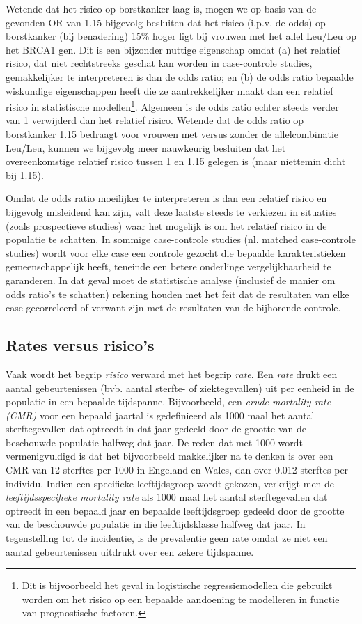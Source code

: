 \documentclass[
  dutch,
  letterpaper,
  12pt]{book}
\theoremstyle{definition}
\theoremstyle{definition}
\theoremstyle{definition}
\theoremstyle{remark}
\begin{document}
Wetende dat het risico op borstkanker laag is, mogen we op basis van de
gevonden OR van 1.15 bijgevolg besluiten dat het risico (i.p.v. de odds)
op borstkanker (bij benadering) 15\% hoger ligt bij vrouwen met het
allel Leu/Leu op het BRCA1 gen. Dit is een bijzonder nuttige eigenschap
omdat (a) het relatief risico, dat niet rechtstreeks geschat kan worden
in case-controle studies, gemakkelijker te interpreteren is dan de odds
ratio; en (b) de odds ratio bepaalde wiskundige eigenschappen heeft die
ze aantrekkelijker maakt dan een relatief risico in statistische
modellen\footnote{Dit is bijvoorbeeld het geval in logistische
  regressiemodellen die gebruikt worden om het risico op een bepaalde
  aandoening te modelleren in functie van prognostische factoren.}.
Algemeen is de odds ratio echter steeds verder van 1 verwijderd dan het
relatief risico. Wetende dat de odds ratio op borstkanker 1.15 bedraagt
voor vrouwen met versus zonder de allelcombinatie Leu/Leu, kunnen we
bijgevolg meer nauwkeurig besluiten dat het overeenkomstige relatief
risico tussen 1 en 1.15 gelegen is (maar niettemin dicht bij 1.15).

Omdat de odds ratio moeilijker te interpreteren is dan een relatief
risico en bijgevolg misleidend kan zijn, valt deze laatste steeds te
verkiezen in situaties (zoals prospectieve studies) waar het mogelijk is
om het relatief risico in de populatie te schatten. In sommige
case-controle studies (nl. matched case-controle studies) wordt voor
elke case een controle gezocht die bepaalde karakteristieken
gemeenschappelijk heeft, teneinde een betere onderlinge
vergelijkbaarheid te garanderen. In dat geval moet de statistische
analyse (inclusief de manier om odds ratio's te schatten) rekening
houden met het feit dat de resultaten van elke case gecorreleerd of
verwant zijn met de resultaten van de bijhorende controle.

\subsection{Rates versus risico's}\label{rates-versus-risicos}

Vaak wordt het begrip \emph{risico} verward met het begrip \emph{rate}.
Een \emph{rate} drukt een aantal gebeurtenissen (bvb. aantal sterfte- of
ziektegevallen) uit per eenheid in de populatie in een bepaalde
tijdspanne. Bijvoorbeeld, een \emph{crude mortality rate (CMR)} voor een
bepaald jaartal is gedefinieerd als 1000 maal het aantal sterftegevallen
dat optreedt in dat jaar gedeeld door de grootte van de beschouwde
populatie halfweg dat jaar. De reden dat met 1000 wordt vermenigvuldigd
is dat het bijvoorbeeld makkelijker na te denken is over een CMR van 12
sterftes per 1000 in Engeland en Wales, dan over 0.012 sterftes per
individu. Indien een specifieke leeftijdsgroep wordt gekozen, verkrijgt
men de \emph{leeftijdsspecifieke mortality rate} als 1000 maal het
aantal sterftegevallen dat optreedt in een bepaald jaar en bepaalde
leeftijdsgroep gedeeld door de grootte van de beschouwde populatie in
die leeftijdsklasse halfweg dat jaar. In tegenstelling tot de
incidentie, is de prevalentie geen rate omdat ze niet een aantal
gebeurtenissen uitdrukt over een zekere tijdspanne.
\end{document}
